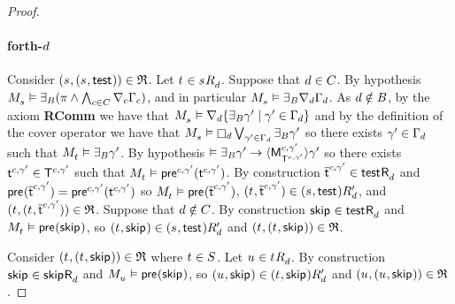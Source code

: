 \begin{proof}
\paragraph{forth-$\agentD$}
Consider $(\kStateS, (\kStateS, \aStateTest)) \in \refinement$.
Let $\kStateT \in \kSuccessorsD{\kStateS}$.
Suppose that $\agentD \in \agentsC$.
By hypothesis $\kPModel{\kStateS} \entails \someactsBs (\pi \land \bigwedge_{\agentC \in \agentsC} \coversC \Gamma_\agentC)$, and in particular $\kPModel{\kStateS} \entails \someactsBs \coversD \Gamma_\agentD$.
As $\agentD \notin \agentsB$, by the \axiomAamlKFF{} axiom {\bf RComm} we have that $\kPModel{\kStateS} \entails \coversD \{\someactsBs \gamma' \mid \gamma' \in \Gamma_\agentD\}$ and by the definition of the cover operator we have that $\kPModel{\kStateS} \entails \necessaryD \bigvee_{\gamma' \in \Gamma_\agentD} \someactsBs \gamma'$ so there exists $\gamma' \in \Gamma_\agentD$ such that $\kPModel{\kStateT} \entails \someactsBs \gamma'$.
By hypothesis $\entails \someactsBs \gamma' \implies \actionE{\aPModel[\agentC, \gamma']{\aStatesT[\agentC, \gamma']}} \gamma'$ so there exists $\aStateT[\agentC, \gamma'] \in \aStatesT[\agentC, \gamma']$ such that $\kPModel{\kStateT} \entails \aPrecondition[\agentC, \gamma'](\aStateT[\agentC, \gamma'])$.
By construction $\aPStateT[\agentC, \gamma'] \in \aSuccessorsD{\aStateTest}$ and $\aPrecondition(\aPStateT[\agentC, \gamma']) = \aPrecondition[\agentC, \gamma'](\aStateT[\agentC, \gamma'])$ so $\kPModel{\kStateT} \entails \aPrecondition(\aPStateT[\agentC, \gamma'])$, $(\kStateT, \aPStateT[\agentC, \gamma']) \in \kSuccessorsPD{(\kStateS, \aStateTest)}$, and $(\kStateT, (\kStateT, \aPStateT[\agentC, \gamma'])) \in \refinement$.
Suppose that $\agentD \notin \agentsC$.
By construction $\aStateSkip \in \aSuccessorsD{\aStateTest}$ and $\kPModel{\kStateT} \entails \aPrecondition(\aStateSkip)$, so $(\kStateT, \aStateSkip) \in \kSuccessorsPD{(\kStateS, \aStateTest)}$ and $(\kStateT, (\kStateT, \aStateSkip)) \in \refinement$.

Consider $(\kStateT, (\kStateT, \aStateSkip)) \in \refinement$ where $\kStateT \in \kStates$.
Let $\kStateU \in \kSuccessorsD{\kStateT}$.
By construction $\aStateSkip \in \aSuccessorsD{\aStateSkip}$ and $\kPModel{\kStateU} \entails \aPrecondition(\aStateSkip)$, so $(\kStateU, \aStateSkip) \in \kSuccessorsPD{(\kStateT, \aStateSkip)}$ and $(\kStateU, (\kStateU, \aStateSkip)) \in \refinement$.


\end{proof}

